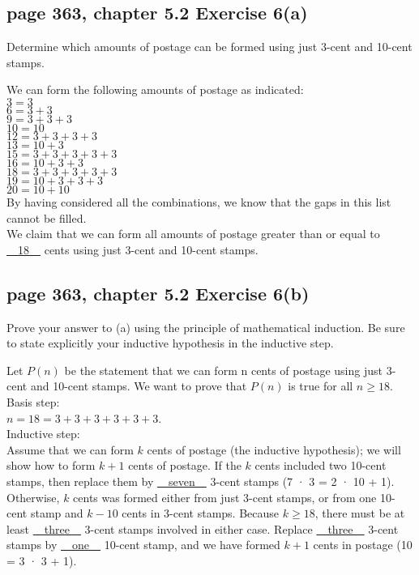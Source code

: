 \documentclass[sigconf]{acmart}
\begin{document}
\subsection{page 363, chapter 5.2 Exercise 6(a)}
\begin{shaded}
    Determine which amounts of postage can be formed using just 3-cent and 10-cent stamps.
\end{shaded}  
We can form the following amounts of postage as indicated:\\
$ 3 = 3$\\
$ 6 = 3 + 3$\\
$ 9 = 3 + 3 + 3$\\
$10 = 10$\\
$12 = 3 + 3 + 3 + 3$\\
$13 = 10 + 3$\\
$15 = 3 + 3 + 3 + 3 + 3$\\
$16 = 10 + 3 + 3$\\
$18 = 3 + 3 + 3 + 3  + 3$\\
$19 = 10 + 3 + 3 + 3$\\
$20 = 10 + 10$\\
By having considered all the combinations, we know that the gaps in this list cannot be filled.\\ We claim that we can form all amounts of postage greater than or equal to \uline{~~18~~} cents using just 3-cent and 10-cent stamps.
    
\subsection{page 363, chapter 5.2 Exercise 6(b)}
\begin{shaded}
    Prove your answer to (a) using the principle of mathematical induction. Be sure to state explicitly your inductive hypothesis in the inductive step.
\end{shaded}
Let $P(n)$ be the statement that we can form n cents of postage using just 3-cent and 10-cent stamps. We want to prove that $P(n)$ is true for all $n \geq 18$.\\
Basis step:\\
$n = 18 = 3 + 3 + 3 + 3 + 3 + 3$. \\
Inductive step:\\
Assume that we can form $k$ cents of postage (the inductive hypothesis); we will show how to form $k + 1$ cents of postage. If the $k$ cents included two 10-cent stamps, then replace them by \uline{~~seven~~} 3-cent stamps (7 · 3 = 2 · 10 + 1).\\
Otherwise, $k$ cents was formed either from just 3-cent stamps, or from one 10-cent stamp and $k-10$ cents in 3-cent stamps. Because $k \geq 18$, there must be at least \uline{~~three~~} 3-cent stamps involved in either case. Replace \uline{~~three~~} 3-cent stamps by \uline{~~one~~} 10-cent stamp, and we have formed $k + 1$ cents in postage (10 = 3 · 3 + 1).
\end{document}
